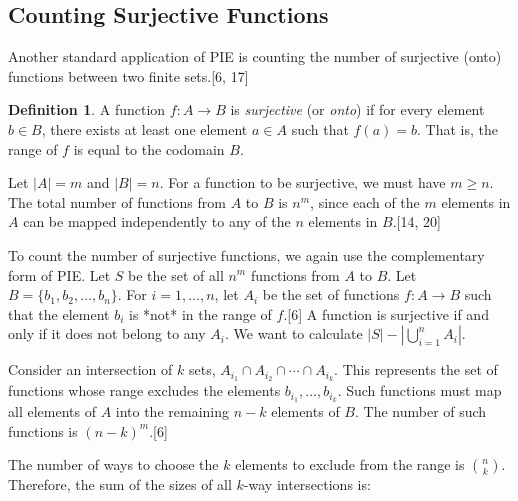 \documentclass[11pt]{amsart}
\theoremstyle{plain}
\theoremstyle{definition}
\newtheorem{definition}[theorem]{Definition}
\theoremstyle{remark}
\begin{document}
\subsection{Counting Surjective Functions}
Another standard application of PIE is counting the number of surjective (onto) functions between two finite sets.[6, 17]

\begin{definition}
A function $f: A \to B$ is \emph{surjective} (or \emph{onto}) if for every element $b \in B$, there exists at least one element $a \in A$ such that $f(a) = b$. That is, the range of $f$ is equal to the codomain $B$.
\end{definition}

Let $|A| = m$ and $|B| = n$. For a function to be surjective, we must have $m \ge n$. The total number of functions from $A$ to $B$ is $n^m$, since each of the $m$ elements in $A$ can be mapped independently to any of the $n$ elements in $B$.[14, 20]

To count the number of surjective functions, we again use the complementary form of PIE. Let $S$ be the set of all $n^m$ functions from $A$ to $B$. Let $B = \{b_1, b_2, \ldots, b_n\}$. For $i = 1, \ldots, n$, let $A_i$ be the set of functions $f: A \to B$ such that the element $b_i$ is *not* in the range of $f$.[6] A function is surjective if and only if it does not belong to any $A_i$. We want to calculate $|S| - |\bigcup_{i=1}^n A_i|$.

Consider an intersection of $k$ sets, $A_{i_1} \cap A_{i_2} \cap \cdots \cap A_{i_k}$. This represents the set of functions whose range excludes the elements $b_{i_1}, \ldots, b_{i_k}$. Such functions must map all elements of $A$ into the remaining $n-k$ elements of $B$. The number of such functions is $(n-k)^m$.[6]

The number of ways to choose the $k$ elements to exclude from the range is $\binom{n}{k}$. Therefore, the sum of the sizes of all $k$-way intersections is:
\
\end{document}

